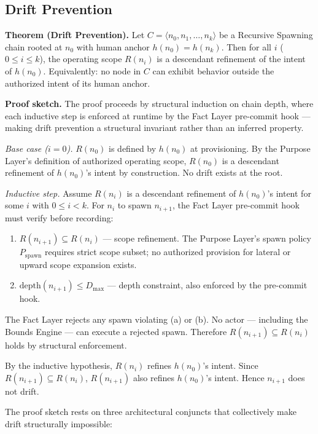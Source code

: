 \subsection{Drift Prevention}
\label{sec:rs-drift-prevention}

\medskip
\noindent\textbf{Theorem (Drift Prevention).} Let $C = \langle n_0, n_1, \ldots, n_k \rangle$ be a Recursive Spawning chain rooted at $n_0$ with human anchor $h(n_0) = h(n_k)$. Then for all $i$ ($0 \leq i \leq k$), the operating scope $R(n_i)$ is a descendant refinement of the intent of $h(n_0)$. Equivalently: no node in $C$ can exhibit behavior outside the authorized intent of its human anchor.

\medskip
\noindent\textbf{Proof sketch.} The proof proceeds by structural induction on chain depth, where each inductive step is enforced at runtime by the Fact Layer pre-commit hook — making drift prevention a structural invariant rather than an inferred property.

\medskip
\textit{Base case ($i=0$).} $R(n_0)$ is defined by $h(n_0)$ at provisioning. By the Purpose Layer's definition of authorized operating scope, $R(n_0)$ is a descendant refinement of $h(n_0)$'s intent by construction. No drift exists at the root.

\medskip
\textit{Inductive step.} Assume $R(n_i)$ is a descendant refinement of $h(n_0)$'s intent for some $i$ with $0 \leq i < k$. For $n_i$ to spawn $n_{i+1}$, the Fact Layer pre-commit hook must verify before recording:
\begin{enumerate}
    \item[(a)] $R(n_{i+1}) \subseteq R(n_i)$ — scope refinement. The Purpose Layer's spawn policy $P_{\mathrm{spawn}}$ requires strict scope subset; no authorized provision for lateral or upward scope expansion exists.
    \item[(b)] $\text{depth}(n_{i+1}) \leq D_{\max}$ — depth constraint, also enforced by the pre-commit hook.
\end{enumerate}
The Fact Layer rejects any spawn violating (a) or (b). No actor — including the Bounds Engine — can execute a rejected spawn. Therefore $R(n_{i+1}) \subseteq R(n_i)$ holds by structural enforcement.

By the inductive hypothesis, $R(n_i)$ refines $h(n_0)$'s intent. Since $R(n_{i+1}) \subseteq R(n_i)$, $R(n_{i+1})$ also refines $h(n_0)$'s intent. Hence $n_{i+1}$ does not drift.

\medskip
The proof sketch rests on three architectural conjuncts that collectively make drift structurally impossible:

